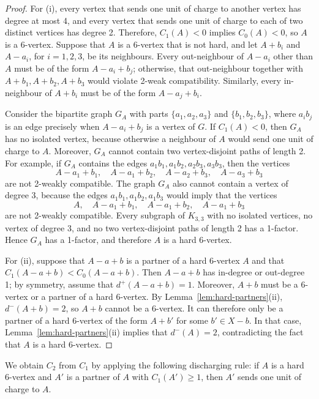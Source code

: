 \documentclass[11pt]{article}
\begin{document}
	\begin{proof}
		For (i), every vertex that sends one unit of charge to another vertex has degree at most 4, and every vertex that sends one unit of charge to each of two distinct vertices has degree 2. Therefore, $C_1(A)<0$ implies $C_0(A)<0$, so $A$ is a 6-vertex. Suppose that $A$ is a 6-vertex that is not hard, and let $A+b_i$ and $A-a_i$, for $i=1,2,3$, be its neighbours. Every out-neighbour of $A-a_i$ other than $A$ must be of the form $A-a_i+b_j$; otherwise, that out-neighbour together with $A+b_1,A+b_2,A+b_3$ would violate 2-weak compatibility. Similarly, every in-neighbour of $A+b_i$ must be of the form $A-a_j+b_i$.
		
		Consider the bipartite graph $G_A$ with parts $\{a_1,a_2,a_3\}$ and $\{b_1,b_2,b_3\}$, where $a_ib_j$ is an edge precisely when $A-a_i+b_j$ is a vertex of $G$. If $C_1(A)<0$, then $G_A$ has no isolated vertex, because otherwise a neighbour of $A$ would send one unit of charge to $A$. Moreover, $G_A$ cannot contain two vertex-disjoint paths of length 2. For example, if $G_A$ contains the edges $a_1b_1,a_1b_2,a_2b_3,a_3b_3$, then the vertices
		\[
		A-a_1+b_1,\quad A-a_1+b_2,\quad A-a_2+b_3,\quad A-a_3+b_3
		\]
		are not 2-weakly compatible. The graph $G_A$ also cannot contain a vertex of degree 3, because the edges $a_1b_1,a_1b_2,a_1b_3$ would imply that the vertices
		\[
		A,\quad A-a_1+b_1,\quad A-a_1+b_2,\quad A-a_1+b_3
		\]
		are not 2-weakly compatible. Every subgraph of $K_{3,3}$ with no isolated vertices, no vertex of degree 3, and no two vertex-disjoint paths of length 2 has a 1-factor. Hence $G_A$ has a 1-factor, and therefore $A$ is a hard 6-vertex.
		
		For (ii), suppose that $A-a+b$ is a partner of a hard 6-vertex $A$ and that $C_1(A-a+b)<C_0(A-a+b)$. Then $A-a+b$ has in-degree or out-degree 1; by symmetry, assume that $d^+(A-a+b)=1$. Moreover, $A+b$ must be a 6-vertex or a partner of a hard 6-vertex. By Lemma~\ref{lem:hard-partners}(ii), $d^-(A+b)=2$, so $A+b$ cannot be a 6-vertex. It can therefore only be a partner of a hard 6-vertex of the form $A+b'$ for some $b'\in X-b$. In that case, Lemma~\ref{lem:hard-partners}(ii) implies that $d^-(A)=2$, contradicting the fact that $A$ is a hard 6-vertex.
	\end{proof}
	
	We obtain $C_2$ from $C_1$ by applying the following discharging rule: if $A$ is a hard 6-vertex and $A'$ is a partner of $A$ with $C_1(A')\ge 1$, then $A'$ sends one unit of charge to $A$.
	
\end{document}
